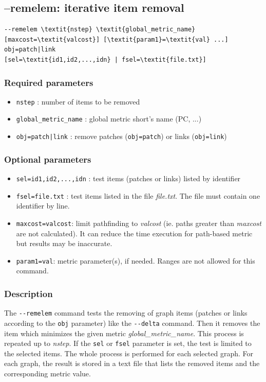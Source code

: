 \documentclass[a4paper,10pt]{report}
\begin{document}
\subsection{--remelem: iterative item removal}
\begin{Verbatim}[commandchars=\\\{\}]
--remelem \textit{nstep} \textit{global_metric_name} [maxcost=\textit{valcost}] [\textit{param1}=\textit{val} ...] obj=patch|link
[sel=\textit{id1,id2,...,idn} | fsel=\textit{file.txt}]
\end{Verbatim}

\subsubsection{Required parameters}
\begin{itemize}
	\item \verb|nstep| : number of items to be removed
	\item \verb|global_metric_name| : global metric short's name (PC, ...)
	\item \verb+obj=patch|link+ : remove patches (\verb+obj=patch+) or links (\verb+obj=link+)
\end{itemize}

\subsubsection{Optional parameters}
\begin{itemize}
	\item \verb|sel=id1,id2,...,idn| : test items (patches or links) listed by identifier
	\item \verb|fsel=file.txt| : test items listed in the file \textit{file.txt}. The file must contain one identifier by line.
	\item \verb|maxcost=valcost|: limit pathfinding to \textit{valcost} (ie. paths greater than \textit{maxcost} are not calculated). It can reduce the time execution for path-based metric but results may be inaccurate.
	\item \verb|param1=val|: metric parameter(s), if needed. Ranges are not allowed for this command.
\end{itemize}

\subsubsection{Description}
The \verb|--remelem| command tests the removing of graph items (patches or links according to the \verb|obj| parameter) like the \verb|--delta| command. Then it removes the item which minimizes the given metric \textit{global\_metric\_name}. This process is repeated up to \textit{nstep}.
If the \verb|sel| or \verb|fsel| parameter is set, the test is limited to the selected items.
The whole process is performed for each selected graph. For each graph, the result
is stored in a text file that lists the removed items and the corresponding metric value.
\end{document}
